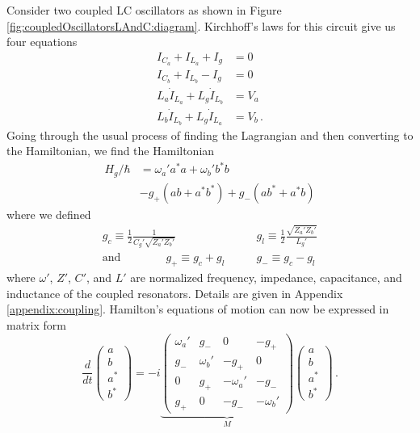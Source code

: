 

Consider two coupled LC oscillators as shown in Figure \ref{fig:coupledOscillatorsLAndC:diagram}.
Kirchhoff's laws for this circuit give us four equations
\begin{align}
  I_{C_a} + I_{L_a} + I_g &= 0 \nonumber \\
  I_{C_b} + I_{L_b} - I_g &= 0 \nonumber \\
  L_a \dot I_{L_a} + L_g \dot I_{L_b} &= V_a \nonumber \\
  L_b \dot I_{L_b} + L_g \dot I_{L_a} &= V_b
  \, .
\end{align}
Going through the usual process of finding the Lagrangian and then converting to the Hamiltonian, we find the Hamiltonian
\begin{align}
  H_g / \hbar
  &= \omega_a' a^* a + \omega_b' b^* b \nonumber \\
  &- g_+ (ab + a^* b^*) + g_- (ab^* + a^* b)
\end{align}
where we defined
\begin{align}
  g_c \equiv \frac{1}{2} \frac{1}{C_g' \sqrt{Z_a' Z_b'}} &\qquad
  g_l \equiv \frac{1}{2} \frac{\sqrt{Z_a' Z_b'}}{L_g'} \nonumber \\
  \text{and} \qquad \qquad
  g_+ \equiv g_c + g_l &\qquad g_- \equiv g_c - g_l
\end{align}
where $\omega'$, $Z'$, $C'$, and $L'$ are normalized frequency, impedance, capacitance, and inductance of the coupled resonators.
Details are given in Appendix \ref{appendix:coupling}.
Hamilton's equations of motion can now be expressed in matrix form
\begin{equation*}
  \frac{d}{dt}
  \left( \begin{array}{c} a \\ b \\ a^* \\ b^* \end{array} \right)
  = -i \underbrace{\left( \begin{array}{cccc}
    \omega_a' & g_- & 0 & -g_+ \\
    g_- & \omega_b' & -g_+ & 0 \\
    0 & g_+ & -\omega_a' & -g _- \\
    g_+ & 0 & -g_- & -\omega_b'
  \end{array} \right)}_M
  \left( \begin{array}{c} a \\ b \\ a^* \\ b^* \end{array} \right) \, .
\end{equation*}
